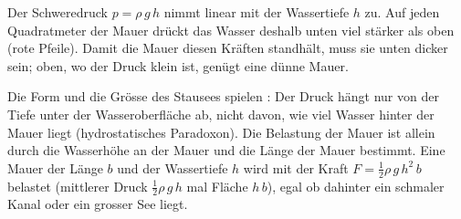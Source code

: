 \begin{center}
\end{center}

Der Schweredruck $p = \rho\,g\,h$ nimmt linear mit der Wassertiefe $h$ zu. Auf jeden Quadratmeter der Mauer drückt das Wasser deshalb unten viel stärker als oben (rote Pfeile). Damit die Mauer diesen Kräften standhält, muss sie unten dicker sein; oben, wo der Druck klein ist, genügt eine dünne Mauer.

Die Form und die Grösse des Stausees spielen : Der Druck hängt nur von der Tiefe unter der Wasseroberfläche ab, nicht davon, wie viel Wasser hinter der Mauer liegt (hydrostatisches Paradoxon). Die Belastung der Mauer ist allein durch die Wasserhöhe an der Mauer und die Länge der Mauer bestimmt. Eine Mauer der Länge $b$ und der Wassertiefe $h$ wird mit der Kraft $F = \frac{1}{2}\rho\,g\,h^2\,b$ belastet (mittlerer Druck $\frac{1}{2}\rho\,g\,h$ mal Fläche $h\,b$), egal ob dahinter ein schmaler Kanal oder ein grosser See liegt.
